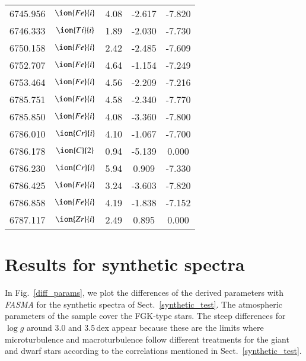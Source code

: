\documentclass[fleqn,usenatbib]{mnras}
\begin{document}
\begin{center}
\begin{table}
\begin{tabular}{ccccc}
6745.956 &  $\ion{Fe}{i}$  & 4.08 & -2.617 & -7.820 \\ 
6746.333 &  $\ion{Ti}{i}$  & 1.89 & -2.030 & -7.730 \\ 
6750.158 &  $\ion{Fe}{i}$  & 2.42 & -2.485 & -7.609 \\ 
6752.707 &  $\ion{Fe}{i}$  & 4.64 & -1.154 & -7.249 \\ 
6753.464 &  $\ion{Fe}{i}$  & 4.56 & -2.209 & -7.216 \\ 
6785.751 &  $\ion{Fe}{i}$  & 4.58 & -2.340 & -7.770 \\ 
6785.850 &  $\ion{Fe}{i}$  & 4.08 & -3.360 & -7.800 \\ 
6786.010 &  $\ion{Cr}{i}$  & 4.10 & -1.067 & -7.700 \\ 
6786.178 &  $\ion{C}{2}$   & 0.94 & -5.139 & 0.000 \\ 
6786.230 &  $\ion{Cr}{i}$  & 5.94 & 0.909 & -7.330 \\ 
6786.425 &  $\ion{Fe}{i}$  & 3.24 & -3.603 & -7.820 \\ 
6786.858 &  $\ion{Fe}{i}$  & 4.19 & -1.838 & -7.152 \\
6787.117 &  $\ion{Zr}{i}$  & 2.49 & 0.895 & 0.000 \\ 
\hline
 \end{tabular}
 \end{table}
 \end{center}


\clearpage


\section{Results for synthetic spectra}\label{diff_synth}

In Fig.~\ref{diff_params}, we plot the differences of the derived parameters with \textit{FASMA} for the synthetic spectra of Sect.~\ref{synthetic_test}. The atmospheric parameters of the 
sample cover the FGK-type stars. The steep differences for $\log g$ around 3.0 and 3.5\,dex appear because these are the limits where microturbulence and macroturbulence follow different 
treatments for the giant and dwarf stars according to the correlations mentioned in Sect.~\ref{synthetic_test}. 
\end{document}
